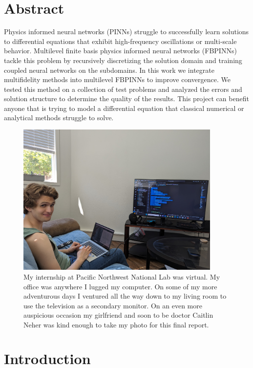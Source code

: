 \documentclass[12pt]{article}
\begin{document}
\section*{Abstract}
\begin{singlespace}
Physics informed neural networks (PINNs) struggle to successfully learn solutions to differential equations that exhibit high-frequency oscillations or multi-scale behavior. Multilevel finite basis physics informed neural networks (FBPINNs) tackle this problem by recursively discretizing the solution domain and training coupled neural networks on the subdomains. In this work we integrate multifidelity methods into multilevel FBPINNs to improve convergence. We tested this method on a collection of test problems and analyzed the errors and solution structure to determine the quality of the results. This project can benefit anyone that is trying to model a differential equation that classical numerical or analytical methods struggle to solve.
\end{singlespace}
\vspace{1cm}
\begin{figure}[H]
\center
\includegraphics[width = 0.9\textwidth]{imgs/me.jpg}
\caption{My internship at Pacific Northwest National Lab was virtual. My office was anywhere I lugged my computer. On some of my more adventurous days I ventured all the way down to my living room to use the television as a secondary monitor. On an even more auspicious occasion my girlfriend and soon to be doctor Caitlin Neher was kind enough to take my photo for this final report.}
\label{fig:me}
\end{figure} 

\vfill
\newpage
\section{Introduction}
\end{document}
